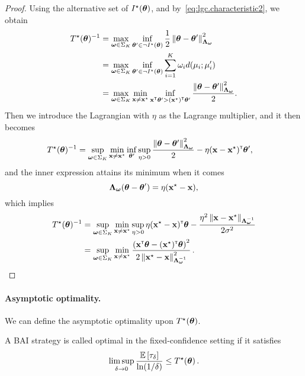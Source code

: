 \begin{proof}
Using the alternative set of $I^\star({\boldsymbol \theta})$, and by~\eqref{eq:lgc.characteristic2}, we obtain
\begin{align*}
    T^\star({\boldsymbol \theta})^{-1} &= \max_{{\boldsymbol \omega} \in \Sigma_K} \inf_{{\boldsymbol \theta}'\in \neg I^\star({\boldsymbol \theta})} \frac{1}{2}\left\lVert{\boldsymbol \theta} - {\boldsymbol \theta}'\right\rVert_{{\boldsymbol \Lambda}_{{\boldsymbol \omega}}}^2\\
    &= \max_{{\boldsymbol \omega}\in\Sigma_K}\inf_{{\boldsymbol \theta}'\in\neg I^\star({\boldsymbol \theta})}\sum_{i=1}^K \omega_i d(\mu_i;\mu_i')\\
    &= \max_{{\boldsymbol \omega}\in\Sigma_K}\min_{{\bf x}\neq{\bf x}^\star}\inf_{{\bf x}^\mathsf{\scriptscriptstyle T}{\boldsymbol \theta}'>({\bf x}^\star)^\mathsf{\scriptscriptstyle T}{\boldsymbol \theta}'} \frac{\left\lVert{\boldsymbol \theta}-{\boldsymbol \theta}'\right\rVert_{{\boldsymbol \Lambda}_{{\boldsymbol \omega}}}^2}{2}.
\end{align*}
Then we introduce the Lagrangian with $\eta$ as the Lagrange multiplier, and it then becomes
\begin{align*}
    T^\star({\boldsymbol \theta})^{-1} &= \sup_{{\boldsymbol \omega}\in\Sigma_K}\min_{{\bf x}\neq{\bf x}^\star}\inf_{{\boldsymbol \theta}'}\sup_{\eta>0} \frac{\left\lVert{\boldsymbol \theta}-{\boldsymbol \theta}'\right\rVert_{{\boldsymbol \Lambda}_{{\boldsymbol \omega}}}^2}{2} - \eta({\bf x}-{\bf x}^\star)^\mathsf{\scriptscriptstyle T}{\boldsymbol \theta}',
\end{align*}
and the inner expression attains its minimum when it comes
\[
    {\boldsymbol \Lambda}_{{\boldsymbol \omega}}({\boldsymbol \theta}-{\boldsymbol \theta}') = \eta({\bf x}^\star-{\bf x}),
\]
which implies
\begin{align*}
    T^\star({\boldsymbol \theta})^{-1} &=
    \sup_{{\boldsymbol \omega}\in\Sigma_K}\min_{{\bf x}\neq{\bf x}^\star}\sup_{\eta>0} \eta({\bf x}^\star-{\bf x})^\mathsf{\scriptscriptstyle T}{\boldsymbol \theta} - \frac{\eta^2\left\lVert{\bf x}-{\bf x}^\star\right\rVert_{{\boldsymbol \Lambda}_{{\boldsymbol \omega}}^{-1}}}{2\sigma^2}\\
    &= \sup_{{\boldsymbol \omega}\in\Sigma_K}\min_{{\bf x}\neq{\bf x}^\star}\frac{\left({\bf x}^\mathsf{\scriptscriptstyle T}{\boldsymbol \theta}-({\bf x}^\star)^\mathsf{\scriptscriptstyle T}{\boldsymbol \theta}\right)^2}{2\left\lVert{\bf x}^\star - {\bf x}\right\rVert^2_{{\boldsymbol \Lambda}_{{\boldsymbol \omega}}^{-1}}}\,.
\end{align*}
\end{proof}

\paragraph{Asymptotic optimality.}
We can define the asymptotic optimality upon $T^\star({\boldsymbol \theta})$. 

\begin{definition}\label{def:lgc.optimality}
\begin{leftbar}[defnbar]
A BAI strategy is called optimal in the fixed-confidence setting if it satisfies
\[
    \limsup_{\delta \rightarrow 0}\frac{\mathbb{E}\left[\tau_\delta\right]}{\ln(1/\delta)} \leq T^\star({\boldsymbol \theta})\,.
\]
\end{leftbar}
\end{definition}

